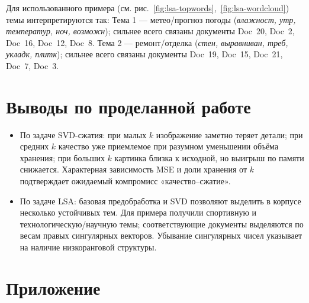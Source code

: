 Для использованного примера (см. рис.~\ref{fig:lsa-topwords},~\ref{fig:lsa-wordcloud}) темы интерпретируются так: Тема 1 — метео/прогноз погоды (\emph{влажност, утр, температур, ноч, возможн}); сильнее всего связаны документы Doc~20, Doc~2, Doc~16, Doc~12, Doc~8. Тема 2 — ремонт/отделка (\emph{стен, выравниван, треб, укладк, плитк}); сильнее всего связаны документы Doc~19, Doc~15, Doc~21, Doc~7, Doc~3.

\section*{Выводы по проделанной работе}
\begin{itemize}
  \item По задаче SVD-сжатия: при малых \(k\) изображение заметно теряет детали; при средних \(k\) качество уже приемлемое при разумном уменьшении объёма хранения; при больших \(k\) картинка близка к исходной, но выигрыш по памяти снижается. Характерная зависимость MSE и доли хранения от \(k\) подтверждает ожидаемый компромисс «качество–сжатие».
  \item По задаче LSA: базовая предобработка и SVD позволяют выделить в корпусе несколько устойчивых тем. Для примера получили спортивную и технологическую/научную темы; соответствующие документы выделяются по весам правых сингулярных векторов. Убывание сингулярных чисел указывает на наличие низкоранговой структуры.
\end{itemize}

\section*{Приложение}
